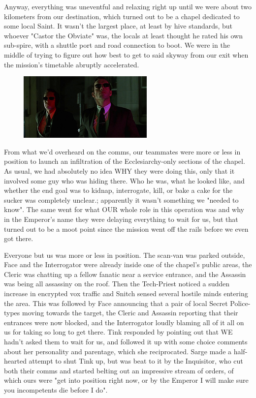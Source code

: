 Anyway, everything was uneventful and relaxing right up until we were about two kilometers from our destination, which turned out to be a chapel dedicated to some local Saint. 
It wasn't the largest place, at least by hive standards, but whoever "Castor the Obviate" was, the locals at least thought he rated his own sub-spire, with a shuttle port and road connection to boot. 
We were in the middle of trying to figure out how best to get to said skyway from our exit when the mission's timetable abruptly accelerated.

\begin{figure}
	\begin{center}
		\includegraphics[width=\figwidth]{pics/17/42.png}
	\end{center}
\end{figure}
From what we'd overheard on the comms, our teammates were more or less in position to launch an infiltration of the Ecclesiarchy-only sections of the chapel. 
As usual, we had absolutely no idea WHY they were doing this, only that it involved some guy who was hiding there. 
Who he was, what he looked like, and whether the end goal was to kidnap, interrogate, kill, or bake a cake for the sucker was completely unclear.; 
apparently it wasn't something we "needed to know". 
The same went for what OUR whole role in this operation was and why in the Emperor's name they were delaying everything to wait for us, but that turned out to be a moot point since the mission went off the rails before we even got there.

Everyone but us was more or less in position. 
The scan-van was parked outside, Face and the Interrogator were already inside one of the chapel's public areas, the Cleric was chatting up a fellow fanatic near a service entrance, and the Assassin was being all assassiny on the roof. 
Then the Tech-Priest noticed a sudden increase in encrypted vox traffic and Snitch sensed several hostile minds entering the area. 
This was followed by Face announcing that a pair of local Secret Police-types moving towards the target, the Cleric and Assassin reporting that their entrances were now blocked, and the Interrogator loudly blaming all of it all on us for taking so long to get there. 
Tink responded by pointing out that WE hadn't asked them to wait for us, and followed it up with some choice comments about her personality and parentage, which she reciprocated. 
Sarge made a half-hearted attempt to shut Tink up, but was beat to it by the Inquisitor, who cut both their comms and started belting out an impressive stream of orders, of which ours were "get into position right now, or by the Emperor I will make sure you incompetents die before I do".

